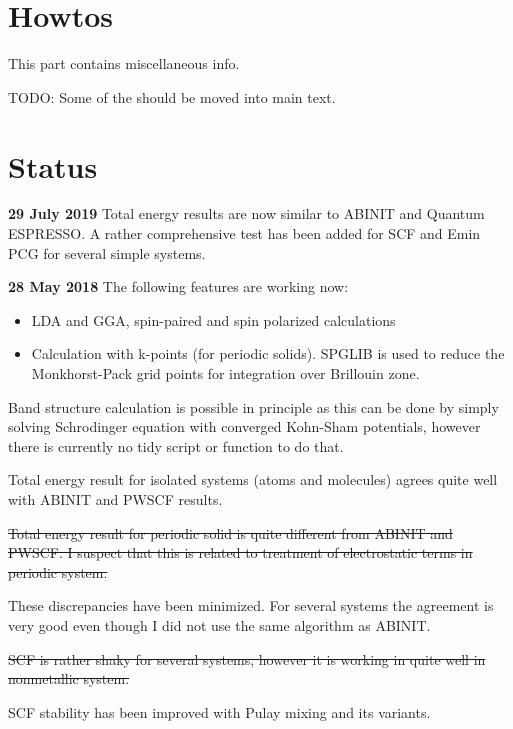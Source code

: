 \documentclass[a4paper,10pt]{article}
\begin{document}
















\appendix
\section{Howtos}

This part contains miscellaneous info.

TODO: Some of the should be moved into main text.




\section*{Status}

\textbf{29 July 2019} Total energy results are now similar to ABINIT
and Quantum ESPRESSO. A rather comprehensive test has been added
for SCF and Emin PCG for several simple systems.


\textbf{28 May 2018} The following features are working now:
\begin{itemize}
\item LDA and GGA, spin-paired and spin polarized calculations
\item Calculation with k-points (for periodic solids).
  \textsf{SPGLIB} is used to reduce the Monkhorst-Pack grid points
  for integration over Brillouin zone.
\end{itemize}

Band structure calculation is possible in principle as this can be
done by simply solving
Schrodinger equation with converged Kohn-Sham potentials, however there
is currently no tidy script or function to do that.

Total energy result for isolated systems (atoms and molecules) agrees quite
well with ABINIT and PWSCF results.

\sout{Total energy result for periodic solid is quite different from ABINIT and PWSCF.
I suspect that this is related to treatment of electrostatic terms in periodic system.}

These discrepancies have been minimized. For several systems the agreement is very good
even though I did not use the same algorithm as ABINIT.

\sout{SCF is rather shaky for several systems, however it is working in quite well in nonmetallic
system.}

SCF stability has been improved with Pulay mixing and its variants.





\end{document}
